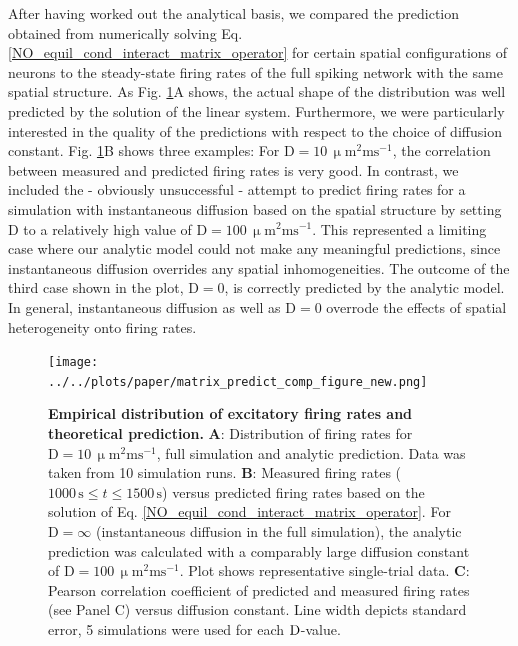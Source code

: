 \documentclass[10pt,letterpaper]{article}
\begin{document}
After having worked out the analytical basis, we compared the prediction obtained from numerically solving Eq. \eqref{NO_equil_cond_interact_matrix_operator} for certain spatial configurations of neurons to the steady-state firing rates of the full spiking network with the same spatial structure. As Fig. \ref{Matrix_Predict_Comp}A shows, the actual shape of the distribution was well predicted by the solution of the linear system. Furthermore, we were particularly interested in the quality of the predictions with respect to the choice of diffusion constant. Fig. \ref{Matrix_Predict_Comp}B shows three examples: For $\mathrm{D=10\, \upmu m^2 ms^{-1}}$, the correlation between measured and predicted firing rates is very good. In contrast, we included the - obviously unsuccessful - attempt to predict firing rates for a simulation with instantaneous diffusion based on the spatial structure by setting D to a relatively high value of $\mathrm{D=100\, \upmu m^2 ms^{-1}}$. This represented a limiting case where our analytic model could not make any meaningful predictions, since instantaneous diffusion overrides any spatial inhomogeneities. The outcome of the third case shown in the plot, $\mathrm{D=0}$, is correctly predicted by the analytic model. In general, instantaneous diffusion as well as $\mathrm{D=0}$ overrode the effects of spatial heterogeneity onto firing rates. 

\begin{figure}
\texttt{[image: ../../plots/paper/matrix\_predict\_comp\_figure\_new.png]}
\caption{{\bf Empirical distribution of excitatory firing rates and theoretical prediction.} \textbf{A}: Distribution of firing rates for $\mathrm{D=10\, \upmu m^2 ms^{-1}}$, full simulation and analytic prediction. Data was taken from 10 simulation runs. \textbf{B}: Measured firing rates ($\mathrm{ 1000\,s} \leq t \leq \mathrm{1500\, s}$) versus predicted firing rates based on the solution of Eq. \eqref{NO_equil_cond_interact_matrix_operator}. For $\mathrm{D=\infty}$ (instantaneous diffusion in the full simulation), the analytic prediction was calculated with a comparably large diffusion constant of $\mathrm{D=100\, \upmu m^2 ms^{-1}}$. Plot shows representative single-trial data. \textbf{C}: Pearson correlation coefficient of predicted and measured firing rates (see Panel C) versus diffusion constant. Line width depicts standard error, 5 simulations were used for each $\rm D$-value.}
\label{Matrix_Predict_Comp}
\end{figure}
\end{document}

